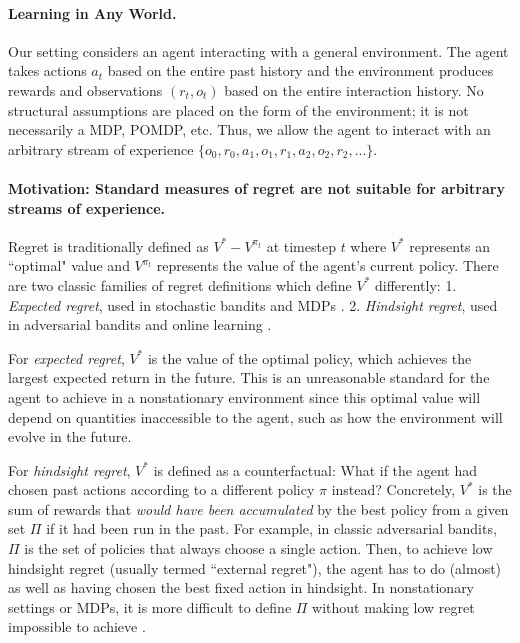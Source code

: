 \paragraph{Learning in Any World.} Our setting considers an agent interacting with a general environment. The agent takes actions $a_t$ based on the entire past history and the environment produces rewards and observations $(r_t, o_t)$ based on the entire interaction history.  
No structural assumptions are placed on the form of the environment; it is not necessarily a MDP, POMDP, etc. Thus, we allow the agent to interact with an arbitrary stream of experience $\{o_0, r_0, a_1, o_1, r_1, a_2, o_2, r_2,...\}$.


\paragraph{Motivation: Standard measures of regret are not suitable for arbitrary streams of experience.} 
Regret is traditionally defined as $V^{*} - V^{\pi_t}$ at timestep $t$
where $V^*$ represents an ``optimal" value 
and $V^{\pi_t}$ represents the value of the agent's current policy.
There are two classic families of regret definitions which define $V^*$ differently: 1. \textit{Expected regret}, used in stochastic bandits \citep{auer2002ucb} and MDPs \citep{puterman2014markov}. 2. \textit{Hindsight regret}, used in adversarial bandits \citep{auer2002nonstochastic} and online learning \citep{zinkevich2003online}. 

For \textit{expected regret}, $V^*$ is the value of the optimal policy, which achieves the largest expected return in the future.
This is an unreasonable standard for the agent to achieve in a nonstationary environment since this optimal value will depend on quantities inaccessible to the agent, such as how the environment will evolve in the future. 

For \textit{hindsight regret}, $V^*$ is defined as a counterfactual: 
What if the agent had chosen past actions according to a different policy $\pi$ instead? 
Concretely, $V^*$ is the sum of rewards that \textit{would have been accumulated} by the best policy from a given set $\Pi$ if it had been run in the past. 
For example, in classic adversarial bandits, $\Pi$ is the set of policies that always choose a single action.
Then, to achieve low hindsight regret (usually termed ``external regret"), the agent has to do (almost) as well as having chosen the best fixed action in hindsight.
In nonstationary settings or MDPs, it is more difficult to define $\Pi$ without making low regret impossible to achieve \citep{even2004experts, even2009online}.

